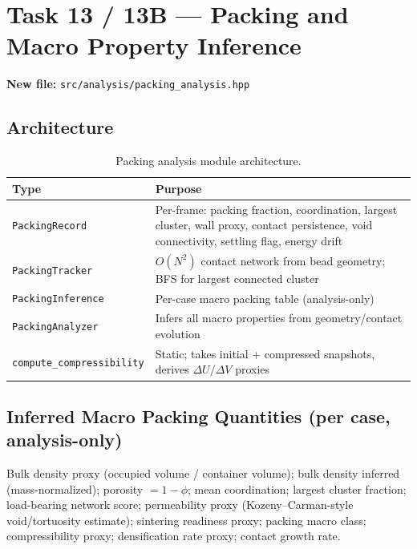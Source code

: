 \documentclass[11pt,a4paper]{article}
\begin{document}
\section{Task 13 / 13B --- Packing and Macro Property Inference}

\textbf{New file:} \texttt{src/analysis/packing\_analysis.hpp}

\subsection{Architecture}

\begin{table}[h!]
\centering
\begin{tabularx}{\linewidth}{lX}
\toprule
\textbf{Type} & \textbf{Purpose} \\
\midrule
\texttt{PackingRecord}          & Per-frame: packing fraction, coordination, largest cluster, wall proxy, contact persistence, void connectivity, settling flag, energy drift \\
\texttt{PackingTracker}         & $O(N^2)$ contact network from bead geometry; BFS for largest connected cluster \\
\texttt{PackingInference}       & Per-case macro packing table (analysis-only) \\
\texttt{PackingAnalyzer}        & Infers all macro properties from geometry/contact evolution \\
\texttt{compute\_compressibility} & Static; takes initial + compressed snapshots, derives $\Delta U / \Delta V$ proxies \\
\bottomrule
\end{tabularx}
\caption{Packing analysis module architecture.}
\end{table}

\subsection{Inferred Macro Packing Quantities (per case, analysis-only)}

Bulk density proxy (occupied volume / container volume); bulk density inferred (mass-normalized);
porosity $= 1 - \phi$; mean coordination; largest cluster fraction; load-bearing network score;
permeability proxy (Kozeny--Carman-style void/tortuosity estimate); sintering readiness proxy;
packing macro class; compressibility proxy; densification rate proxy; contact growth rate.
\end{document}
